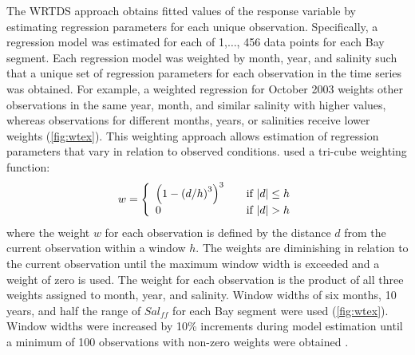 \documentclass[letterpaper,12pt,oneside]{article}\usepackage{graphicx, color}
\begin{document}
The \ac{WRTDS} approach obtains fitted values of the response variable by estimating regression parameters for each unique observation.  Specifically, a regression model was estimated for each of 1,$\ldots$, 456 data points for each Bay segment. Each regression model was weighted by month, year, and salinity such that a unique set of regression parameters for each observation in the time series was obtained. For example, a weighted regression for October 2003 weights other observations in the same year, month, and similar salinity with higher values, whereas observations for different months, years, or salinities receive lower weights (\cref{fig:wtex}).  This weighting approach allows estimation of regression parameters that vary in relation to observed conditions.  \citet{Hirsch10} used a tri-cube weighting function:
\begin{equation}
w= \left\{ 
  \begin{array}{l l}
    \left(1-\left(d/h\right)^3\right)^3 & \quad \textrm{if } |d| \leq h \\
    0 & \quad \textrm{if } |d| > h 
  \end{array} \right.
\end{equation}
\noindent where the weight $w$ for each observation is defined by the distance $d$ from the current observation within a window $h$. The weights are diminishing in relation to the current observation until the maximum window width is exceeded and a weight of zero is used.  The weight for each observation is the product of all three weights assigned to month, year, and salinity.  Window widths of six months, 10 years, and half the range of $Sal_{ff}$ for each Bay segment were used (\cref{fig:wtex}).  Window widths were increased by 10\% increments during model estimation until a minimum of 100 observations with non-zero weights were obtained \citep{Hirsch10}.
\end{document}
